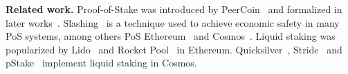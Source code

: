 \noindent
\textbf{Related work.}
Proof-of-Stake was introduced by PeerCoin~\cite{peercoin} and formalized
in later works~\cite{ouroboros,praos,ouroboros-genesis,algorand,DBLP:journals/iacr/BentovPS16a}.
Slashing~\cite{slashing} is a technique used to achieve economic safety
in many PoS systems, among others
PoS Ethereum~\cite{casper,buterin2020combining,sompolinsky2015secure,kiayias2017trees}
and
Cosmos~\cite{2018tendermint,buchman2016tendermint,cosmossdk}.
Liquid staking was popularized by Lido~\cite{lido} and Rocket Pool~\cite{rocket-pool}
in Ethereum. Quicksilver~\cite{quicksilver}, Stride~\cite{stride} and
pStake~\cite{pstake} implement liquid staking in Cosmos.

